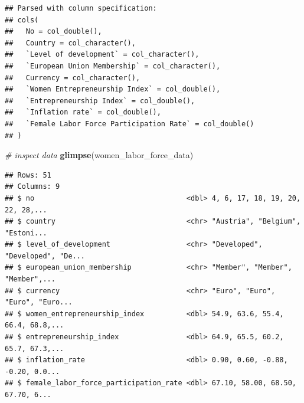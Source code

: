 \documentclass[
]{book}
\newenvironment{Shaded}{\begin{snugshade}}{\end{snugshade}}
\newcommand{\CommentTok}[1]{\textcolor[rgb]{0.56,0.35,0.01}{\textit{#1}}}
\newcommand{\DataTypeTok}[1]{\textcolor[rgb]{0.13,0.29,0.53}{#1}}
\newcommand{\KeywordTok}[1]{\textcolor[rgb]{0.13,0.29,0.53}{\textbf{#1}}}
\newcommand{\NormalTok}[1]{#1}
\newcommand{\OperatorTok}[1]{\textcolor[rgb]{0.81,0.36,0.00}{\textbf{#1}}}
\newcommand{\StringTok}[1]{\textcolor[rgb]{0.31,0.60,0.02}{#1}}
\begin{document}
\begin{Shaded}
\end{Shaded}

\begin{verbatim}
## Parsed with column specification:
## cols(
##   No = col_double(),
##   Country = col_character(),
##   `Level of development` = col_character(),
##   `European Union Membership` = col_character(),
##   Currency = col_character(),
##   `Women Entrepreneurship Index` = col_double(),
##   `Entrepreneurship Index` = col_double(),
##   `Inflation rate` = col_double(),
##   `Female Labor Force Participation Rate` = col_double()
## )
\end{verbatim}

\begin{Shaded}
\begin{Highlighting}[]
\CommentTok{# inspect data}
\KeywordTok{glimpse}\NormalTok{(women_labor_force_data)}
\end{Highlighting}
\end{Shaded}

\begin{verbatim}
## Rows: 51
## Columns: 9
## $ no                                    <dbl> 4, 6, 17, 18, 19, 20, 22, 28,...
## $ country                               <chr> "Austria", "Belgium", "Estoni...
## $ level_of_development                  <chr> "Developed", "Developed", "De...
## $ european_union_membership             <chr> "Member", "Member", "Member",...
## $ currency                              <chr> "Euro", "Euro", "Euro", "Euro...
## $ women_entrepreneurship_index          <dbl> 54.9, 63.6, 55.4, 66.4, 68.8,...
## $ entrepreneurship_index                <dbl> 64.9, 65.5, 60.2, 65.7, 67.3,...
## $ inflation_rate                        <dbl> 0.90, 0.60, -0.88, -0.20, 0.0...
## $ female_labor_force_participation_rate <dbl> 67.10, 58.00, 68.50, 67.70, 6...
\end{verbatim}
\end{document}
